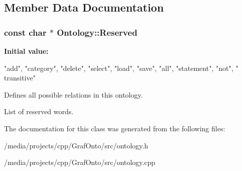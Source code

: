 \subsection{\-Member \-Data \-Documentation}
\hypertarget{class_ontology_a68187ced293d40e2d1e5315c284184a8}{
\subsubsection[{\-Reserved}]{\setlength{\rightskip}{0pt plus 5cm}const char $\ast$ {\bf \-Ontology\-::\-Reserved}}}\label{class_ontology_a68187ced293d40e2d1e5315c284184a8}
{\bfseries \-Initial value\-:}
\begin{DoxyCode}
 {"add", "category", "delete", "select", "load",
                                    "save", "all", "statement", "not", "
      transitive"}
\end{DoxyCode}


\-Defines all possible relations in this ontology. 

\-List of reserved words. 

\-The documentation for this class was generated from the following files\-:\begin{DoxyCompactItemize}
\item 
/media/projects/cpp/\-Graf\-Onto/src/ontology.\-h\item 
/media/projects/cpp/\-Graf\-Onto/src/ontology.\-cpp\end{DoxyCompactItemize}
